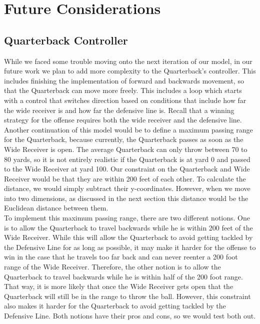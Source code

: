 \newpage


\section{Future Considerations}

\subsection{Quarterback Controller}

\quad While we faced some trouble moving onto the next iteration of our model, in our future work we plan to add more complexity to the Quarterback’s controller. This includes finishing the implementation of forward and backwards movement, so that the Quarterback can move more freely. This includes a loop which starts with a control that switches direction based on conditions that include how far the wide receiver is and how far the defensive line is. Recall that a winning strategy for the offense requires both the wide receiver and the defensive line. \\

Another continuation of this model would be to define a maximum passing range for the Quarterback, because currently, the Quarterback passes as soon as the Wide Receiver is open. The average Quarterback can only throw between 70 to 80 yards, so it is not entirely realistic if the Quarterback is at yard 0 and passed to the Wide Receiver at yard 100. Our constraint on the Quarterback and Wide Receiver would be that they are within 200 feet of each other. To calculate the distance, we would simply subtract their y-coordinates. However, when we move into two dimensions, as discussed in the next section this distance would be the Euclidean distance between them. \\

To implement this maximum passing range, there are two different notions. One is to allow the Quarterback to travel backwards while he is within 200 feet of the Wide Receiver. While this will allow the Quarterback to avoid getting tackled by the Defensive Line for as long as possible, it may make it harder for the offense to win in the case that he travels too far back and can never reenter a 200 foot range of the Wide Receiver. Therefore, the other notion is to allow the Quarterback to travel backwards while he is within half of the 200 foot range. That way, it is more likely that once the Wide Receiver gets open that the Quarterback will still be in the range to throw the ball. However, this constraint also makes it harder for the Quarterback to avoid getting tackled by the Defensive Line. Both notions have their pros and cons, so we would test both out. \\

